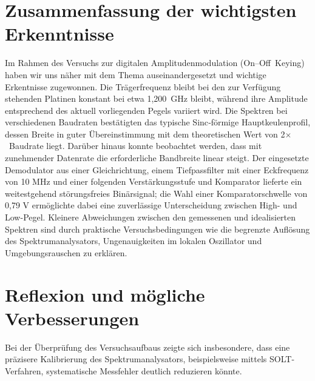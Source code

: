 
\section{Zusammenfassung der wichtigsten Erkenntnisse}
Im Rahmen des Versuchs zur digitalen Amplitudenmodulation (On--Off~Keying) haben wir uns näher mit dem Thema auseinandergesetzt und wichtige Erkentnisse zugewonnen. Die Trägerfrequenz bleibt bei den zur Verfügung stehenden Platinen konstant bei etwa 1,200~GHz bleibt, während ihre Amplitude entsprechend des aktuell vorliegenden Pegels variiert wird.
Die Spektren bei verschiedenen Baudraten bestätigten das typische Sinc‑förmige Hauptkeulenprofil, dessen Breite in guter Übereinstimmung mit dem theoretischen Wert von 2$\times$~Baudrate liegt. 
Darüber hinaus konnte beobachtet werden, dass mit zunehmender Datenrate die erforderliche Bandbreite linear steigt.
Der eingesetzte Demodulator aus einer Gleichrichtung, einem Tiefpassfilter mit einer Eckfrequenz von 10 MHz und einer folgenden Verstärkungsstufe und Komparator lieferte ein weitestgehend störungsfreies Binärsignal; die Wahl einer Komparatorschwelle von 0,79 V ermöglichte dabei eine zuverlässige Unterscheidung zwischen High- und Low-Pegel. Kleinere Abweichungen zwischen den gemessenen und idealisierten Spektren sind durch praktische Versuchsbedingungen wie die begrenzte Auflösung des Spektrumanalysators, Ungenauigkeiten im lokalen Oszillator und Umgebungsrauschen zu erklären.
\section{Reflexion und mögliche Verbesserungen}
Bei der Überprüfung des Versuchsaufbaus zeigte sich insbesondere, dass eine präzisere Kalibrierung des Spektrumanalysators, beispielsweise mittels SOLT-Verfahren, systematische Messfehler deutlich reduzieren könnte. 
\clearpage